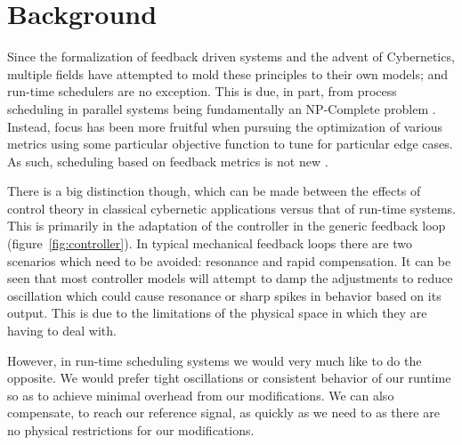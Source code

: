 \chapter{Background}
%
\label{chap:background}



Since the formalization of feedback driven systems and the advent of Cybernetics, multiple fields have attempted 
to mold these principles to their own models; and run-time schedulers are no exception. This is due, in part, from
process scheduling in parallel systems being fundamentally an NP-Complete problem \cite{bruno1976computer}. Instead,
focus has been more fruitful when pursuing the optimization of various metrics using some particular objective 
function \cite{garey1978performance} to tune for particular edge cases. As such, scheduling based on feedback 
metrics is not new \cite{dietz1997use}.

There is a big distinction though, which can be made between the effects of control theory in classical cybernetic applications 
versus that of run-time systems. This is primarily in the adaptation of the controller in the generic feedback 
loop (figure~\ref{fig:controller}).
In typical mechanical feedback loops there are two scenarios which need to be avoided: resonance 
and rapid compensation. It can be seen that most controller models will attempt to damp the adjustments to reduce 
oscillation which could cause resonance or sharp spikes in behavior based on its output. This is due to the  
limitations of the physical space in which they are having to deal with. 

However, in run-time scheduling systems we would very much like to do the opposite. We would prefer tight oscillations or 
consistent behavior of our runtime so as to achieve minimal overhead from our modifications. We can also compensate, 
to reach our reference signal, as quickly as we need to as there are no physical restrictions for our modifications. 

